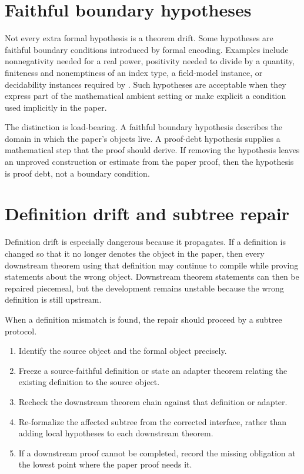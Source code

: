 \documentclass[11pt]{article}
\begin{document}
\section{Faithful boundary hypotheses}

Not every extra formal hypothesis is a theorem drift.  Some hypotheses are
faithful boundary conditions introduced by formal encoding.  Examples include
nonnegativity needed for a real power, positivity needed to divide by a
quantity, finiteness and nonemptiness of an index type, a field-model instance,
or decidability instances required by \Lean{}.  Such hypotheses are acceptable
when they express part of the mathematical ambient setting or make explicit a
condition used implicitly in the paper.

The distinction is load-bearing.  A faithful boundary hypothesis describes the
domain in which the paper's objects live.  A proof-debt hypothesis supplies a
mathematical step that the proof should derive.  If removing the hypothesis
leaves an unproved construction or estimate from the paper proof, then the
hypothesis is proof debt, not a boundary condition.

\section{Definition drift and subtree repair}

Definition drift is especially dangerous because it propagates.  If a
definition is changed so that it no longer denotes the object in the paper,
then every downstream theorem using that definition may continue to compile
while proving statements about the wrong object.  Downstream theorem statements
can then be repaired piecemeal, but the development remains unstable because
the wrong definition is still upstream.

When a definition mismatch is found, the repair should proceed by a subtree
protocol.

\begin{enumerate}
  \item Identify the source object and the formal object precisely.
  \item Freeze a source-faithful definition or state an adapter theorem
  relating the existing definition to the source object.
  \item Recheck the downstream theorem chain against that definition or adapter.
  \item Re-formalize the affected subtree from the corrected interface, rather
  than adding local hypotheses to each downstream theorem.
  \item If a downstream proof cannot be completed, record the missing obligation
  at the lowest point where the paper proof needs it.
\end{enumerate}
\end{document}
